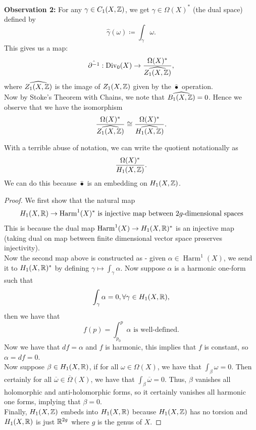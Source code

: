 \documentclass{article}
\begin{document}
{\textbf{Observation 2: } For any $\gamma \in C_1(X, \mathbb{Z})$, we get $\hat{\gamma} \in \Omega(X)^*$ (the dual space) defined by
\[\hat{\gamma}(\omega)  \coloneqq \int_\gamma \omega.\]
This gives us a map:
\[\hat{\partial^{-1}} : \operatorname{Div}_0(X) \to \frac{\Omega(X)^*}{\widehat{Z_1(X, \mathbb{Z})}},\]
where $\widehat{Z_1(X, \mathbb{Z})}$ is the image of $Z_1(X, \mathbb{Z})$ given by the $\hat{\bullet}$ operation.\\

Now by Stoke's Theorem with Chains, we note that $\widehat{B_1(X, \mathbb{Z})} = 0$. Hence we observe that we have the isomorphism
\[\frac{\Omega(X)^*}{\widehat{Z_1(X, \mathbb{Z})}} \cong \frac{\Omega(X)^*}{\widehat{H_1(X, \mathbb{Z})}}.\]

\begin{proposition}
With a terrible abuse of notation, we can write the quotient notationally as
\[\frac{\Omega(X)^*}{H_1(X, \mathbb{Z})}.\]
We can do this because $\hat{\bullet}$ is an embedding on $H_1(X, \mathbb{Z})$.    
\end{proposition}
 
\begin{proof}
We first show that the natural map
\[H_1(X, \mathbb{R}) \to \operatorname{Harm}^1(X)^*  \text{ is injective map between $2g$-dimensional spaces}\]
This is because the dual map $\operatorname{Harm}^1(X) \to H_1(X, \mathbb{R})^*$ is an injective map (taking dual on map between finite dimensional vector space preserves injectivity).\\

Now the second map above is constructed as - given $\alpha \in \operatorname{Harm}^1(X)$, we send it to $H_1(X, \mathbb{R})^*$ by defining $\gamma \mapsto \int_\gamma \alpha$. Now suppose $\alpha$ is a harmonic one-form such that
\[\int_\gamma \alpha = 0, \forall \gamma \in H_1(X, \mathbb{R}),\]
then we have that
\[f(p) = \int_{p_0}^p \alpha \text{ is well-defined}.\]
Now we have that $df = \alpha$ and $f$ is harmonic, this implies that $f$ is constant, so $\alpha = df = 0$.\\

Now suppose $\beta \in H_1(X, \mathbb{R})$, if for all $\omega \in \Omega(X)$, we have that $\int_\beta \omega = 0$. Then certainly for all $\overline{\omega} \in \overline{\Omega}(X)$, we have that $\int_\beta \overline{\omega} = 0$. Thus, $\beta$ vanishes all holomorphic and anti-holomorphic forms, so it certainly vanishes all harmonic one forms, implying that $\beta = 0$.\\

Finally, $H_1(X, \mathbb{Z})$ embeds into $H_1(X, \mathbb{R})$ because $H_1(X, \mathbb{Z})$ has no torsion and $H_1(X, \mathbb{R})$ is just $\mathbb{R}^{2g}$ where $g$ is the genus of $X$.
\end{proof}

}
\end{document}
